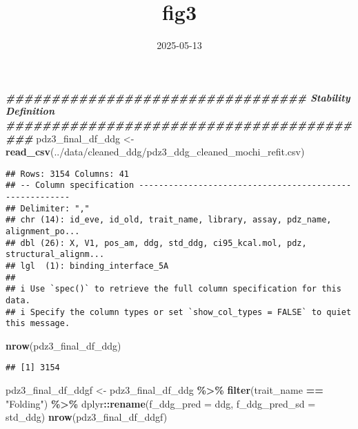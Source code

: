 \documentclass[
]{article}
\title{fig3}
\author{}
\date{\vspace{-2.5em}2025-05-13}
\newenvironment{Shaded}{\begin{snugshade}}{\end{snugshade}}
\newcommand{\AttributeTok}[1]{\textcolor[rgb]{0.13,0.29,0.53}{#1}}
\newcommand{\DocumentationTok}[1]{\textcolor[rgb]{0.56,0.35,0.01}{\textbf{\textit{#1}}}}
\newcommand{\FunctionTok}[1]{\textcolor[rgb]{0.13,0.29,0.53}{\textbf{#1}}}
\newcommand{\NormalTok}[1]{#1}
\newcommand{\OtherTok}[1]{\textcolor[rgb]{0.56,0.35,0.01}{#1}}
\newcommand{\SpecialCharTok}[1]{\textcolor[rgb]{0.81,0.36,0.00}{\textbf{#1}}}
\newcommand{\StringTok}[1]{\textcolor[rgb]{0.31,0.60,0.02}{#1}}
\begin{document}
\maketitle

\begin{Shaded}
\begin{Highlighting}[]
\DocumentationTok{\#\#\#\#\#\#\#\#\#\#\#\#\#\#\#\#\#\#\#\#\#\#\#\#\#\#\#\#\#\#\#\#\# Stability Definition \#\#\#\#\#\#\#\#\#\#\#\#\#\#\#\#\#\#\#\#\#\#\#\#\#\#\#\#\#\#\#\#\#\#\#\#\#\#\#\#\#}
\NormalTok{pdz3\_final\_df\_ddg }\OtherTok{\textless{}{-}} \FunctionTok{read\_csv}\NormalTok{(}\StringTok{\textquotesingle{}../data/cleaned\_ddg/pdz3\_ddg\_cleaned\_mochi\_refit.csv\textquotesingle{}}\NormalTok{)}
\end{Highlighting}
\end{Shaded}

\begin{verbatim}
## Rows: 3154 Columns: 41
## -- Column specification --------------------------------------------------------
## Delimiter: ","
## chr (14): id_eve, id_old, trait_name, library, assay, pdz_name, alignment_po...
## dbl (26): X, V1, pos_am, ddg, std_ddg, ci95_kcal.mol, pdz, structural_alignm...
## lgl  (1): binding_interface_5A
## 
## i Use `spec()` to retrieve the full column specification for this data.
## i Specify the column types or set `show_col_types = FALSE` to quiet this message.
\end{verbatim}

\begin{Shaded}
\begin{Highlighting}[]
\FunctionTok{nrow}\NormalTok{(pdz3\_final\_df\_ddg)}
\end{Highlighting}
\end{Shaded}

\begin{verbatim}
## [1] 3154
\end{verbatim}

\begin{Shaded}
\begin{Highlighting}[]
\NormalTok{pdz3\_final\_df\_ddgf }\OtherTok{\textless{}{-}}\NormalTok{ pdz3\_final\_df\_ddg }\SpecialCharTok{\%\textgreater{}\%} \FunctionTok{filter}\NormalTok{(trait\_name }\SpecialCharTok{==} \StringTok{"Folding"}\NormalTok{) }\SpecialCharTok{\%\textgreater{}\%} 
\NormalTok{  dplyr}\SpecialCharTok{::}\FunctionTok{rename}\NormalTok{(}\AttributeTok{f\_ddg\_pred =}\NormalTok{ ddg,}
                \AttributeTok{f\_ddg\_pred\_sd =}\NormalTok{ std\_ddg)}
\FunctionTok{nrow}\NormalTok{(pdz3\_final\_df\_ddgf)}
\end{Highlighting}
\end{Shaded}
\end{document}

